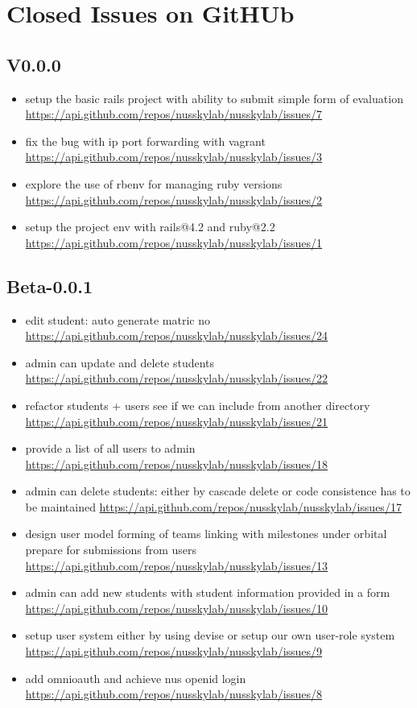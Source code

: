 \chapter{Closed Issues on GitHUb}

{\tiny
\section{V0.0.0}
\begin{itemize}[noitemsep]
    \item setup the basic rails project with ability to submit simple form of evaluation \url{https://api.github.com/repos/nusskylab/nusskylab/issues/7} 
    \item fix the bug with ip port forwarding with vagrant \url{https://api.github.com/repos/nusskylab/nusskylab/issues/3} 
    \item explore the use of rbenv for managing ruby versions \url{https://api.github.com/repos/nusskylab/nusskylab/issues/2} 
    \item setup the project env with rails@4.2 and ruby@2.2 \url{https://api.github.com/repos/nusskylab/nusskylab/issues/1} 
\end{itemize}

\section{Beta-0.0.1}
\begin{itemize}[noitemsep]
    \item edit student: auto generate matric no \url{https://api.github.com/repos/nusskylab/nusskylab/issues/24} 
    \item admin can update and delete students \url{https://api.github.com/repos/nusskylab/nusskylab/issues/22} 
    \item refactor students + users  see if we can include from another directory \url{https://api.github.com/repos/nusskylab/nusskylab/issues/21} 
    \item provide a list of all users to admin \url{https://api.github.com/repos/nusskylab/nusskylab/issues/18} 
    \item admin can delete students: either by cascade delete or code  consistence has to be maintained \url{https://api.github.com/repos/nusskylab/nusskylab/issues/17} 
    \item design user model  forming of teams  linking with milestones under orbital  prepare for submissions from users  \url{https://api.github.com/repos/nusskylab/nusskylab/issues/13} 
    \item admin can add new students  with student information provided in a form \url{https://api.github.com/repos/nusskylab/nusskylab/issues/10} 
    \item setup user system  either by using devise or setup our own user-role system \url{https://api.github.com/repos/nusskylab/nusskylab/issues/9} 
    \item add omnioauth and achieve nus openid login \url{https://api.github.com/repos/nusskylab/nusskylab/issues/8} 
\end{itemize}

}
